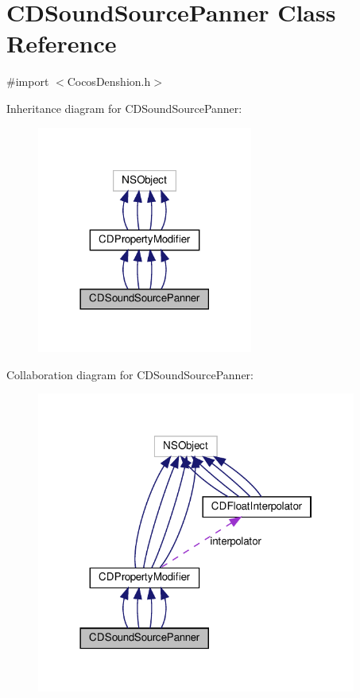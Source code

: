 \hypertarget{interfaceCDSoundSourcePanner}{}\section{C\+D\+Sound\+Source\+Panner Class Reference}
\label{interfaceCDSoundSourcePanner}


{\ttfamily \#import $<$Cocos\+Denshion.\+h$>$}



Inheritance diagram for C\+D\+Sound\+Source\+Panner\+:
\nopagebreak
\begin{figure}[H]
\begin{center}
\leavevmode
\includegraphics[width=201pt]{interfaceCDSoundSourcePanner__inherit__graph}
\end{center}
\end{figure}


Collaboration diagram for C\+D\+Sound\+Source\+Panner\+:
\nopagebreak
\begin{figure}[H]
\begin{center}
\leavevmode
\includegraphics[width=298pt]{interfaceCDSoundSourcePanner__coll__graph}
\end{center}
\end{figure}
